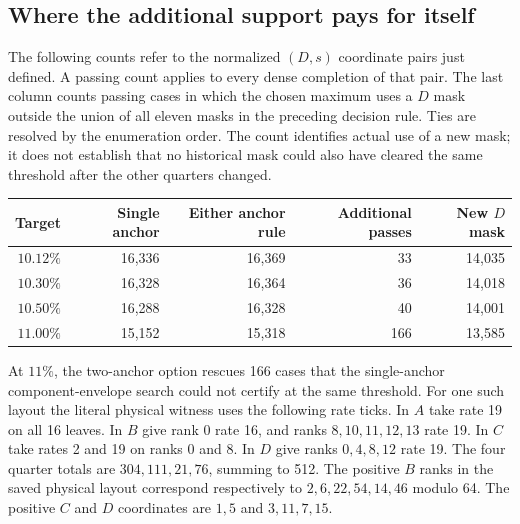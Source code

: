 \documentclass[12pt,letterpaper]{article}
\begin{document}
\subsection{Where the additional support pays for itself}

The following counts refer to the normalized \((D,s)\) coordinate pairs just defined. A passing count applies to every dense completion of that pair. The last column counts passing cases in which the chosen maximum uses a \(D\) mask outside the union of all eleven masks in the preceding decision rule. Ties are resolved by the enumeration order. The count identifies actual use of a new mask; it does not establish that no historical mask could also have cleared the same threshold after the other quarters changed.
\begin{center}
\begin{tabular}{@{}rrrrr@{}}
\toprule
Target & Single anchor & Either anchor rule & Additional passes & New \(D\) mask\\
\midrule
\(10.12\%\) & 16,336 & 16,369 & 33 & 14,035\\
\(10.30\%\) & 16,328 & 16,364 & 36 & 14,018\\
\(10.50\%\) & 16,288 & 16,328 & 40 & 14,001\\
\(11.00\%\) & 15,152 & 15,318 & 166 & 13,585\\
\bottomrule
\end{tabular}
\end{center}
At \(11\%\), the two-anchor option rescues 166 cases that the single-anchor component-envelope search could not certify at the same threshold. For one such layout the literal physical witness uses the following rate ticks. In \(A\) take rate 19 on all 16 leaves. In \(B\) give rank 0 rate 16, and ranks \(8,10,11,12,13\) rate 19. In \(C\) take rates 2 and 19 on ranks 0 and 8. In \(D\) give ranks \(0,4,8,12\) rate 19. The four quarter totals are \(304,111,21,76\), summing to 512. The positive \(B\) ranks in the saved physical layout correspond respectively to \(2,6,22,54,14,46\) modulo 64. The positive \(C\) and \(D\) coordinates are \(1,5\) and \(3,11,7,15\).
\end{document}
